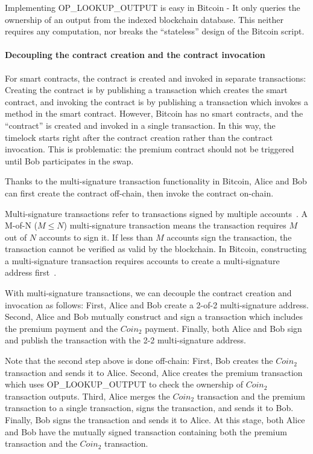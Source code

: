 Implementing OP\_LOOKUP\_OUTPUT is easy in Bitcoin - It only queries the ownership of an output from the indexed blockchain database.
This neither requires any computation, nor breaks the ``stateless'' design of the Bitcoin script.


\paragraph{Decoupling the contract creation and the contract invocation}
For smart contracts, the contract is created and invoked in separate transactions:
Creating the contract is by publishing a transaction which creates the smart contract,
and invoking the contract is by publishing a transaction which invokes a method in the smart contract.
However, Bitcoin has no smart contracts, and the ``contract'' is created and invoked in a single transaction.
In this way, the timelock starts right after the contract creation rather than the contract invocation.
This is problematic: the premium contract should not be triggered until Bob participates in the swap.


Thanks to the multi-signature transaction functionality in Bitcoin,
Alice and Bob can first create the contract off-chain, then invoke the contract on-chain.

Multi-signature transactions refer to transactions signed by multiple accounts~\cite{okupski2014bitcoin}.
A M-of-N ($M \leq N$) multi-signature transaction means the transaction requires $M$ out of $N$ accounts to sign it.
If less than $M$ accounts sign the transaction, the transaction cannot be verified as valid by the blockchain.
In Bitcoin, constructing a multi-signature transaction requires accounts to create a multi-signature address first~\cite{okupski2014bitcoin}.

With multi-signature transactions, we can decouple the contract creation and invocation as follows:
First, Alice and Bob create a 2-of-2 multi-signature address. 
Second, Alice and Bob mutually construct and sign a transaction which includes the premium payment and the $Coin_2$ payment.
Finally, both Alice and Bob sign and publish the transaction with the 2-2 multi-signature address.

Note that the second step above is done off-chain:
First, Bob creates the $Coin_2$ transaction and sends it to Alice.
Second, Alice creates the premium transaction which uses OP\_LOOKUP\_OUTPUT to check the ownership of $Coin_2$ transaction outputs.
Third, Alice merges the $Coin_2$ transaction and the premium transaction to a single transaction, signs the transaction, and sends it to Bob.
Finally, Bob signs the transaction and sends it to Alice.
At this stage, both Alice and Bob have the mutually signed transaction containing both the premium transaction and the $Coin_2$ transaction.

